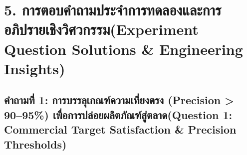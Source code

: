 \documentclass[12pt,a4paper]{article}
\begin{document}
\vspace{0.5em}
\clearpage
\section*{5. การตอบคำถามประจำการทดลองและการอภิปรายเชิงวิศวกรรม\newline \large(Experiment Question Solutions \& Engineering Insights)}

\subsection*{คำถามที่ 1: การบรรลุเกณฑ์ความเที่ยงตรง (Precision > 90--95\%) เพื่อการปล่อยผลิตภัณฑ์สู่ตลาด\newline \normalsize(Question 1: Commercial Target Satisfaction \& Precision Thresholds)}
\end{document}
